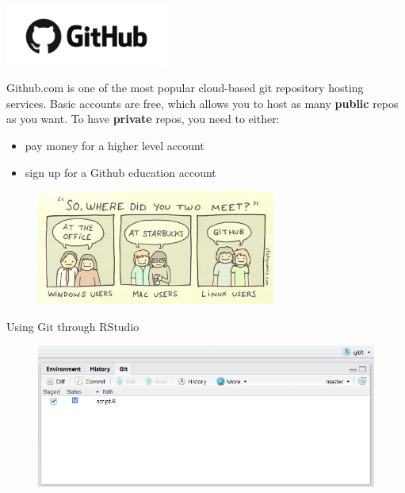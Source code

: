 \documentclass{beamer}
\begin{document}




\begin{frame}{\includegraphics[width=0.4\textwidth]{github}}

  Github.com is one of the most popular cloud-based git repository hosting
  services. Basic accounts are free, which allows you to host as many
  \textbf{public} repos as you want. To have \textbf{private} repos,
  you need to either:
  \begin{itemize}
  \item pay money for a higher level account
  \item sign up for a Github education account 
  \end{itemize}

  \pause

  \begin{figure}
    \centering
    \includegraphics[width=0.7\textwidth]{comic1}
  \end{figure}
  
\end{frame}

\begin{frame}{Using Git through RStudio}

  \begin{figure}
    \centering
    \includegraphics[width=\textwidth]{rstudiogit}
  \end{figure}

\end{frame}
\end{document}
